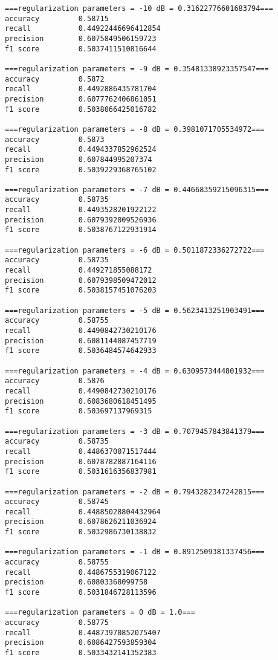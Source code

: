     \begin{Verbatim}[commandchars=\\\{\}]
===regularization parameters = -10 dB = 0.31622776601683794===
accuracy         0.58715
recall           0.44922446696412854
precision        0.6075849506159723
f1 score         0.5037411510816644

===regularization parameters = -9 dB = 0.35481338923357547===
accuracy         0.5872
recall           0.4492886435781704
precision        0.6077762406861051
f1 score         0.5038066425016782

===regularization parameters = -8 dB = 0.3981071705534972===
accuracy         0.5873
recall           0.4494337852962524
precision        0.607844995207374
f1 score         0.5039229368765102

===regularization parameters = -7 dB = 0.44668359215096315===
accuracy         0.58735
recall           0.4493528201922122
precision        0.6079392009526936
f1 score         0.5038767122931914

===regularization parameters = -6 dB = 0.5011872336272722===
accuracy         0.58735
recall           0.449271855088172
precision        0.6079398509472012
f1 score         0.5038157451076203

===regularization parameters = -5 dB = 0.5623413251903491===
accuracy         0.58755
recall           0.4490842730210176
precision        0.6081144087457719
f1 score         0.5036484574642933

===regularization parameters = -4 dB = 0.6309573444801932===
accuracy         0.5876
recall           0.4490842730210176
precision        0.6083680618451495
f1 score         0.503697137969315

===regularization parameters = -3 dB = 0.7079457843841379===
accuracy         0.58735
recall           0.4486370071517444
precision        0.6078782887164116
f1 score         0.5031616356837981

===regularization parameters = -2 dB = 0.7943282347242815===
accuracy         0.58745
recall           0.44885028804432964
precision        0.6078626211036924
f1 score         0.5032986730138832

===regularization parameters = -1 dB = 0.8912509381337456===
accuracy         0.58755
recall           0.4486755319067122
precision        0.60803368099758
f1 score         0.5031846728113596

===regularization parameters = 0 dB = 1.0===
accuracy         0.58775
recall           0.44873970852075407
precision        0.6086427593859304
f1 score         0.5033432141352383


\end{Verbatim}
